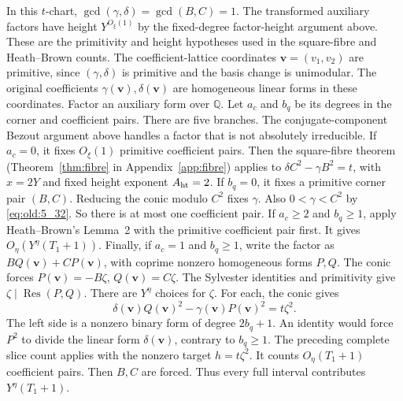 In this \(t\)-chart, \(\gcd(\gamma,\delta)=\gcd(B,C)=1\). The
transformed auxiliary factors have height \(Y^{O_\xi(1)}\) by the
fixed-degree factor-height argument above. These are the primitivity and
height hypotheses used in the square-fibre and Heath--Brown counts.
The coefficient-lattice coordinates \(\mathbf v=(v_1,v_2)\) are primitive,
since \((\gamma,\delta)\) is primitive and the basis change is
unimodular. The original coefficients \(\gamma(\mathbf v),\delta(\mathbf v)\)
are homogeneous linear forms in these coordinates.
Factor an auxiliary form over \(\mathbb Q\). Let \(a_c\)
and \(b_q\) be its degrees in the corner and coefficient pairs. There are
five branches. The conjugate-component Bezout argument above handles a
factor that is not absolutely irreducible. If \(a_c=0\),
it fixes \(O_\xi(1)\) primitive coefficient pairs. Then the
square-fibre theorem (Theorem~\ref{thm:fibre} in
Appendix~\ref{app:fibre}) applies to
\(\delta C^2-\gamma B^2=t\), with \(x=2Y\) and fixed height exponent
\(A_{\rm ht}=2\). If \(b_q=0\), it fixes a primitive corner pair
\((B,C)\). Reducing the conic modulo \(C^2\) fixes \(\gamma\). Also
\(0<\gamma<C^2\) by \eqref{eq:old:5_32}. So there is at most one coefficient pair.
If \(a_c\ge2\) and \(b_q\ge1\), apply Heath--Brown's Lemma~2 with the
primitive coefficient pair first. It gives \(O_\eta(Y^\eta(T_1+1))\).
Finally, if \(a_c=1\) and \(b_q\ge1\), write the factor as
\(B Q(\mathbf v)+C P(\mathbf v)\), with coprime nonzero homogeneous forms
\(P,Q\). The conic forces \(P(\mathbf v)=-B\zeta\),
\(Q(\mathbf v)=C\zeta\). The Sylvester
identities and primitivity give \(\zeta\mid\operatorname{Res}(P,Q)\).
There are \(Y^\eta\) choices for \(\zeta\). For each, the conic gives
\[
 \delta(\mathbf v) Q(\mathbf v)^2-\gamma(\mathbf v) P(\mathbf v)^2=t\zeta^2.
\]
  The left side is a nonzero binary form of degree \(2b_q+1\). An identity
  would force \(P^2\) to divide the linear form \(\delta(\mathbf v)\), contrary
  to \(b_q\ge1\). The preceding complete slice count applies with the
  nonzero target \(h=t\zeta^2\). It counts \(O_\eta(T_1+1)\) coefficient
  pairs. Then \(B,C\) are forced. Thus every full interval
  contributes \(Y^\eta(T_1+1)\).

